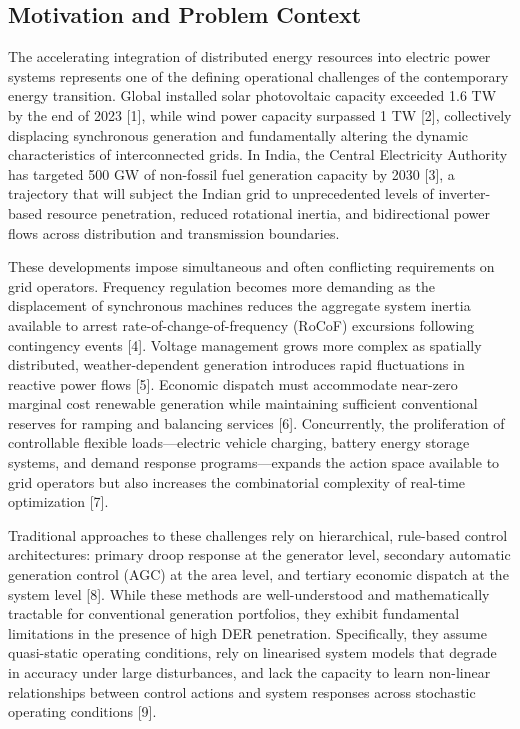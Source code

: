 \documentclass[conference]{IEEEtran}
\begin{document}
\subsection{Motivation and Problem Context}

The accelerating integration of distributed energy resources into electric power systems represents one of the defining operational challenges of the contemporary energy transition. Global installed solar photovoltaic capacity exceeded 1.6 TW by the end of 2023 [1], while wind power capacity surpassed 1 TW [2], collectively displacing synchronous generation and fundamentally altering the dynamic characteristics of interconnected grids. In India, the Central Electricity Authority has targeted 500 GW of non-fossil fuel generation capacity by 2030 [3], a trajectory that will subject the Indian grid to unprecedented levels of inverter-based resource penetration, reduced rotational inertia, and bidirectional power flows across distribution and transmission boundaries.

These developments impose simultaneous and often conflicting requirements on grid operators. Frequency regulation becomes more demanding as the displacement of synchronous machines reduces the aggregate system inertia available to arrest rate-of-change-of-frequency (RoCoF) excursions following contingency events [4]. Voltage management grows more complex as spatially distributed, weather-dependent generation introduces rapid fluctuations in reactive power flows [5]. Economic dispatch must accommodate near-zero marginal cost renewable generation while maintaining sufficient conventional reserves for ramping and balancing services [6]. Concurrently, the proliferation of controllable flexible loads---electric vehicle charging, battery energy storage systems, and demand response programs---expands the action space available to grid operators but also increases the combinatorial complexity of real-time optimization [7].

Traditional approaches to these challenges rely on hierarchical, rule-based control architectures: primary droop response at the generator level, secondary automatic generation control (AGC) at the area level, and tertiary economic dispatch at the system level [8]. While these methods are well-understood and mathematically tractable for conventional generation portfolios, they exhibit fundamental limitations in the presence of high DER penetration. Specifically, they assume quasi-static operating conditions, rely on linearised system models that degrade in accuracy under large disturbances, and lack the capacity to learn non-linear relationships between control actions and system responses across stochastic operating conditions [9].
\end{document}
